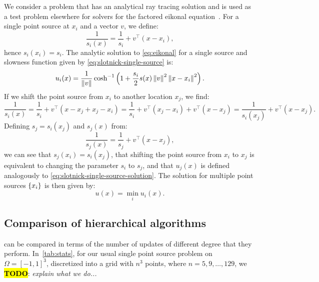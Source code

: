 \documentclass[sisc-eikonal.tex]{subfiles}
\begin{document}
We consider a problem that has an analytical ray tracing solution and
is used as a test problem elsewhere for solvers for the factored
eikonal
equation~\cite{slotnick1959lessons,fomel2009fast,qi2018corner}. For a
single point source at $x_i$ and a vector $v$, we define:
\begin{equation}
  \label{eq:slotnick-single-source}
  \frac{1}{s_i(x)} = \frac{1}{s_i} + v^\top {(x - x_i)},
\end{equation}
hence $s_i(x_i) = s_i$. The analytic solution to \cref{eq:eikonal} for a
single source and slowness function given by
\cref{eq:slotnick-single-source} is:
\begin{equation}
  \label{eq:slotnick-single-source-solution}
  u_i(x) = \frac{1}{\norm{v}} \cosh^{-1} \parens{1 + \frac{s_i}{2} s(x) \norm{v}^2 \norm{x - x_i}^2}.
\end{equation}
If we shift the point source from $x_i$ to another location $x_j$, we
find:
\begin{equation}
  \label{eq:slotnick-slowness-shift}
  \frac{1}{s_i(x)} = \frac{1}{s_i} + v^\top {(x - x_j + x_j - x_i)} = \frac{1}{s_i} + v^\top {(x_j - x_i)} + v^\top {(x - x_j)} = \frac{1}{s_i(x_j)} + v^\top {(x - x_j)}.
\end{equation}
Defining $s_j = s_i(x_j)$ and $s_j(x)$ from:
\begin{equation}
  \frac{1}{s_j(x)} = \frac{1}{s_j} + v^\top {(x - x_j)},
\end{equation}
we can see that $s_j(x_i) = s_i(x_j)$, that shifting the point source
from $x_i$ to $x_j$ is equivalent to changing the parameter $s_i$ to
$s_j$, and that $u_j(x)$ is defined analogously to
\cref{eq:slotnick-single-source-solution}. The solution for multiple
point sources $\left\{x_i\right\}$ is then given by:
\begin{equation}
  u(x) = \min_i u_i(x).
\end{equation}

\subsection{Comparison of hierarchical algorithms}\label{ssec:alg-comparison}

 can be compared in terms of the
number of updates of different degree that they
perform. In~\cref{tab:stats}, for our usual single point source
problem on $\Omega = [-1, 1]^3$, discretized into a grid with $n^3$
points, where $n = 5, 9, \hdots, 129$, we \hl{\textbf{TODO}}:
\emph{explain what we do...}

%   
\end{document}
